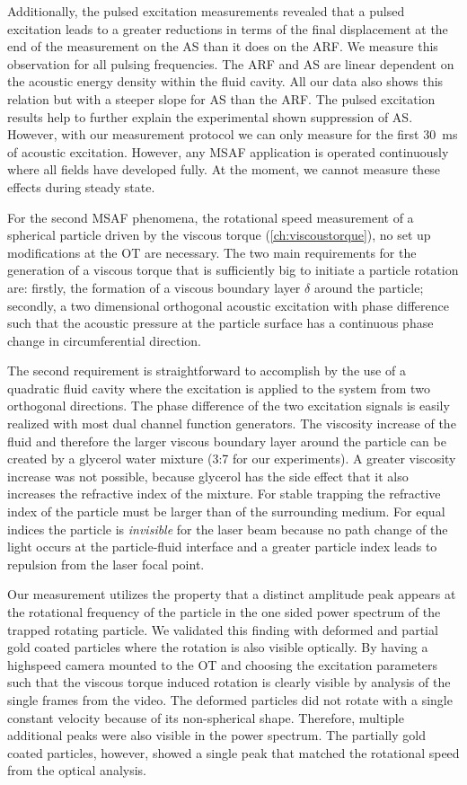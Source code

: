 Additionally, the pulsed excitation measurements revealed that a pulsed 
excitation leads to a greater reductions in terms of the final displacement at 
the end of the measurement on the AS than it does on the ARF. We measure this 
observation for all pulsing frequencies. The ARF and AS are linear dependent on 
the acoustic energy density within the fluid cavity. All our data also shows 
this relation but with a steeper slope for AS than the ARF. The pulsed 
excitation results help to further explain the experimental shown suppression 
of AS. However, with our measurement protocol we can only measure for the 
first \SI{30}{\ms} of acoustic excitation. However, any MSAF application is 
operated continuously where all fields have developed fully. At the moment, we 
cannot measure these effects during steady state.

For the second MSAF phenomena, the rotational speed measurement of a spherical 
particle driven by the viscous torque (\cref{ch:viscoustorque}), no set up 
modifications at the OT are necessary. The two main requirements for the 
generation of a viscous torque that is sufficiently big to initiate a particle 
rotation are: firstly, the formation of a viscous boundary layer $\delta$ 
around the particle; secondly, a two dimensional orthogonal acoustic excitation 
with phase difference such that the acoustic pressure at the particle surface 
has a continuous phase change in circumferential direction.

The second requirement is straightforward to accomplish by the use of a 
quadratic fluid cavity where the excitation is applied to the system from two 
orthogonal directions. The phase difference of the two excitation signals is 
easily realized with most dual channel function generators. The viscosity 
increase of the fluid and therefore the larger viscous boundary layer around 
the particle can be created by a glycerol water mixture (3:7 for our 
experiments). A greater viscosity increase was not possible, because glycerol 
has the side effect that it also increases the refractive index of the mixture.  
For stable trapping the refractive index of the particle must be larger than of 
the surrounding medium. For equal indices the particle is \emph{invisible} for 
the laser beam because no path change of the light occurs at the particle-fluid 
interface and a greater particle index leads to repulsion from the laser focal 
point.

Our measurement utilizes the property that a distinct amplitude peak appears at 
the rotational frequency of the particle in the one sided power spectrum of the 
trapped rotating particle. We validated this finding with deformed and partial 
gold coated particles where the rotation is also visible optically. By having a 
highspeed camera mounted to the OT and choosing the excitation parameters such 
that the viscous torque induced rotation is clearly visible by analysis of the 
single frames from the video. The deformed particles did not rotate with a 
single constant velocity because of its non-spherical shape. Therefore, 
multiple additional peaks were also visible in the power spectrum. The 
partially gold coated particles, however, showed a single peak that matched the 
rotational speed from the optical analysis.

